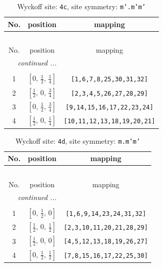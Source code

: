 \documentclass[fleqn,8pt]{jsarticle}
\begin{document}
\renewcommand{\arraystretch}{1.2}
\begin{longtable}{ccc}
\caption{Wyckoff site: {\tt 4c}, site symmetry: {\tt m'.m'm'}}
 \\
 \hline \hline
No. & position & mapping \\ \hline \endfirsthead

\multicolumn{2}{l}{\tablename\ \thetable{}} \\
 \hline \hline
No. & position & mapping \\ \hline \endhead

 \hline \hline
\multicolumn{2}{r}{\footnotesize\it continued ...} \\ \endfoot

 \hline \hline
\multicolumn{2}{r}{} \\ \endlastfoot

1 & $\left[ 0,\, \frac{1}{2},\, \frac{1}{4} \right]$ & {\tt [1,6,7,8,25,30,31,32]} \\ \hline
2 & $\left[ \frac{1}{2},\, 0,\, \frac{3}{4} \right]$ & {\tt [2,3,4,5,26,27,28,29]} \\ \hline
3 & $\left[ 0,\, \frac{1}{2},\, \frac{3}{4} \right]$ & {\tt [9,14,15,16,17,22,23,24]} \\ \hline
4 & $\left[ \frac{1}{2},\, 0,\, \frac{1}{4} \right]$ & {\tt [10,11,12,13,18,19,20,21]} \\
\end{longtable}
\renewcommand{\arraystretch}{1.2}
\begin{longtable}{ccc}
\caption{Wyckoff site: {\tt 4d}, site symmetry: {\tt m.m'm'}}
 \\
 \hline \hline
No. & position & mapping \\ \hline \endfirsthead

\multicolumn{2}{l}{\tablename\ \thetable{}} \\
 \hline \hline
No. & position & mapping \\ \hline \endhead

 \hline \hline
\multicolumn{2}{r}{\footnotesize\it continued ...} \\ \endfoot

 \hline \hline
\multicolumn{2}{r}{} \\ \endlastfoot

1 & $\left[ 0,\, \frac{1}{2},\, 0 \right]$ & {\tt [1,6,9,14,23,24,31,32]} \\ \hline
2 & $\left[ \frac{1}{2},\, 0,\, \frac{1}{2} \right]$ & {\tt [2,3,10,11,20,21,28,29]} \\ \hline
3 & $\left[ \frac{1}{2},\, 0,\, 0 \right]$ & {\tt [4,5,12,13,18,19,26,27]} \\ \hline
4 & $\left[ 0,\, \frac{1}{2},\, \frac{1}{2} \right]$ & {\tt [7,8,15,16,17,22,25,30]} \\
\end{longtable}
\end{document}

